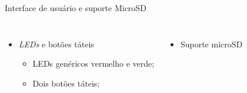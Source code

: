 \begin{frame}{Interface de usuário e suporte MicroSD}

\begin{columns}
        \centering
        \begin{itemize}
            \item \textit{LEDs} e botões táteis
            \begin{itemize}
                \item LEDs genéricos vermelho e verde;
                \item Dois botões táteis;
            \end{itemize}
        \end{itemize}
        
        \centering
        \begin{itemize}
            \item Suporte microSD
        \end{itemize}
   
\end{columns}


\end{frame}

